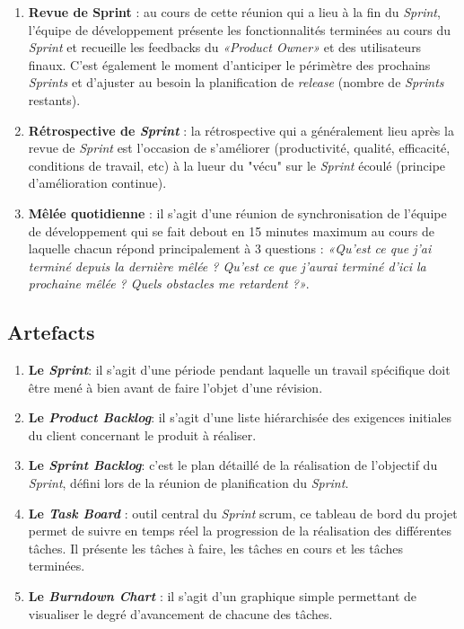 \begin{appendices}
\begin{enumerate}[parsep=0cm,itemsep=0cm]
\item \textbf{Revue de Sprint} : au cours de cette réunion qui a lieu à la fin du \textit{Sprint}, l'équipe de développement présente les fonctionnalités terminées au cours du \textit{Sprint} et recueille les feedbacks du \textit{«Product Owner»} et des utilisateurs finaux. C'est également le moment d'anticiper le périmètre des prochains \textit{Sprints} et d'ajuster au besoin la planification de \textit{release} (nombre de \textit{Sprints} restants).

\item \textbf{Rétrospective de \textit{Sprint}} : la rétrospective qui a généralement lieu après la revue de \textit{Sprint} est l'occasion de s'améliorer (productivité, qualité, efficacité, conditions de travail, etc) à la lueur du "vécu" sur le \textit{Sprint} écoulé (principe d'amélioration continue).

\item \textbf{Mêlée quotidienne}  : il s'agit d'une réunion de synchronisation de l'équipe de développement qui se fait debout en 15 minutes maximum au cours de laquelle chacun répond principalement à 3 questions : \textit{«Qu'est ce que j'ai terminé depuis la dernière mêlée ? Qu'est ce que j'aurai terminé d'ici la prochaine mêlée ? Quels obstacles me retardent ?»}.
\end{enumerate}

\subsection{Artefacts}
\begin{enumerate}[parsep=0cm,itemsep=0cm]
\item \textbf{Le \textit{Sprint}}: il s'agit d'une période pendant laquelle un travail spécifique doit être mené à bien avant de faire l'objet d'une révision.
\item \textbf{Le \textit{Product Backlog}}: il s'agit d'une liste hiérarchisée des exigences initiales du client concernant le produit à réaliser.
\item \textbf{Le \textit{Sprint Backlog}}: c'est le plan détaillé de la réalisation de l'objectif du \textit{Sprint}, défini lors de la réunion de planification du \textit{Sprint}.
\item \textbf{Le \textit{Task Board}} : outil central du \textit{Sprint} scrum, ce tableau de bord du projet permet de suivre en temps réel la progression de la réalisation des différentes tâches. Il pr\'esente les tâches à faire, les tâches en cours et les tâches terminées.
\item \textbf{Le \textit{Burndown Chart}} : il s’agit d’un graphique simple permettant de visualiser le degré d’avancement de chacune des tâches.
\end{enumerate}

\end{appendices}

